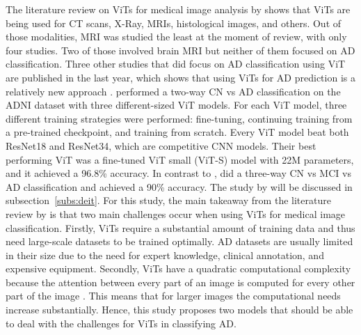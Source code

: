 \documentclass[11pt, a4paper]{article}
\begin{document}
The literature review on ViTs for medical image analysis by \cite{He2022TransformersReview} shows that ViTs are being used for CT scans, X-Ray, MRIs, histological images, and others. Out of those modalities, MRI was studied the least at the moment of review, with only four studies. Two of those involved brain MRI but neither of them focused on AD classification. Three other studies that did focus on AD classification using ViT are published in the last year, which shows that using ViTs for AD prediction is a relatively new approach \citep{Lyu2022ClassificationTransformer,Sarraf2022OViTAD:Data,Yin2022SMIL-DeiT:MultipleClassification}. \cite{Lyu2022ClassificationTransformer} performed a two-way CN vs AD classification on the ADNI dataset with three different-sized ViT models. For each ViT model, three different training strategies were performed: fine-tuning, continuing training from a pre-trained checkpoint, and training from scratch. Every ViT model beat both ResNet18 and ResNet34, which are competitive CNN models. Their best performing ViT was a fine-tuned ViT small (ViT-S) model with 22M parameters, and it achieved a 96.8\% accuracy. In contrast to \cite{Lyu2022ClassificationTransformer}, \cite{Sarraf2022OViTAD:Data} did a three-way CN vs MCI vs AD classification and achieved a 90\% accuracy. The study by \cite{Yin2022SMIL-DeiT:MultipleClassification} will be discussed in subsection~\ref{subs:deit}. For this study, the main takeaway from the literature review by \cite{He2022TransformersReview} is that two main challenges occur when using ViTs for medical image classification. Firstly, ViTs require a substantial amount of training data and thus need large-scale datasets to be trained optimally. AD datasets are usually limited in their size due to the need for expert knowledge, clinical annotation, and expensive equipment. Secondly, ViTs have a quadratic computational complexity because the attention between every part of an image is computed for every other part of the image \citep{Dosovitskiy2020AnScale}. This means that for larger images the computational needs increase substantially. Hence, this study proposes two models that should be able to deal with the challenges for ViTs in classifying AD.
\end{document}
